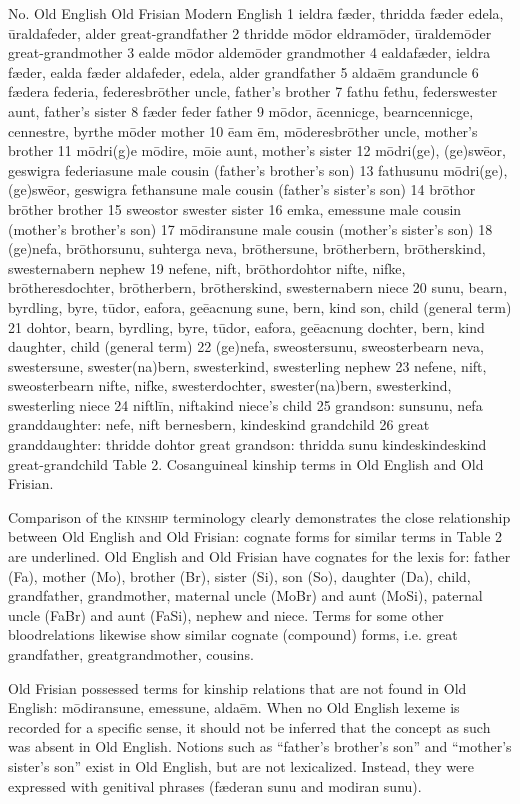 No.	Old English	Old Frisian	Modern English
1	ieldra fæder, thridda fæder	edela, ūraldafeder, alder	great-grandfather
2	thridde mōdor	eldramōder, ūraldemōder	great-grandmother
3	ealde mōdor	aldemōder	grandmother
4	ealdafæder, ieldra fæder, ealda fæder	aldafeder, edela, alder	grandfather
5		aldaēm	granduncle
6	fædera	federia, federesbrōther	uncle, father's brother
7	fathu	fethu, federswester	aunt, father's sister
8	fæder	feder	father
9	mōdor, ācennicge, bearncennicge, cennestre, byrthe	mōder	mother
10	ēam	ēm, mōderesbrōther	uncle, mother's brother
11	mōdri(g)e	mōdire, mōie	aunt, mother's sister
12	mōdri(ge), (ge)swēor, geswigra	federiasune 	male cousin 
(father's brother's son)
13	fathusunu
mōdri(ge), (ge)swēor, geswigra	fethansune	male cousin 
(father's sister's son)
14	brōthor	brōther	brother
15	sweostor	swester	sister
16		emka, emessune	male cousin 
(mother's brother's son)
17		mōdiransune	male cousin 
(mother's sister's son)
18	(ge)nefa, brōthorsunu, suhterga	neva, brōthersune, 
brōtherbern, brōtherskind, swesternabern	nephew
19	nefene, nift, brōthordohtor	nifte, nifke, brōtheresdochter, 
brōtherbern, brōtherskind, swesternabern	niece
20	sunu, bearn, 
byrdling, byre, tūdor, eafora, geēacnung 	sune, bern, 
kind	son, child (general term)
21	dohtor, bearn, 
byrdling, byre, tūdor, eafora, geēacnung	dochter, bern, 
kind	daughter, child (general term)
22	(ge)nefa, sweostersunu, 
sweosterbearn	neva, swestersune, 
swester(na)bern, swesterkind, swesterling	nephew
23	nefene, nift, 
sweosterbearn	nifte, nifke, swesterdochter, 
swester(na)bern, swesterkind, swesterling	niece
24		niftlīn, niftakind	niece's child
25	grandson: sunsunu, nefa
granddaughter: nefe, nift	bernesbern, kindeskind	grandchild
26	great granddaughter: thridde dohtor
great grandson: thridda sunu	kindeskindeskind	great-grandchild
Table 2. Cosanguineal kinship terms in Old English and Old Frisian.

Comparison of the \textsc{kinship} terminology clearly demonstrates the close relationship between Old English and Old Frisian: cognate forms for similar terms in Table 2 are underlined. Old English and Old Frisian have cognates for the lexis for: father (Fa), mother (Mo), brother (Br), sister (Si), son (So), daughter (Da), child, grandfather, grandmother, maternal uncle (MoBr) and aunt (MoSi), paternal uncle (FaBr) and aunt (FaSi), nephew and niece. Terms for some other bloodrelations likewise show similar cognate (compound) forms, i.e. great grandfather, greatgrandmother, cousins.

Old Frisian possessed terms for kinship relations that are not found in Old English: mōdiransune, emessune, aldaēm. When no Old English lexeme is recorded for a specific sense, it should not be inferred that the concept as such was absent in Old English. Notions such as “father’s brother’s son” and “mother’s sister’s son” exist in Old English, but are not lexicalized. Instead, they were expressed with genitival phrases (fæderan sunu and modiran sunu).

